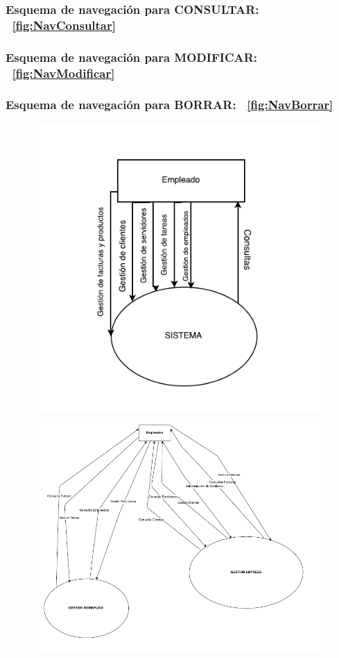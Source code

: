 \documentclass[paper=a4, fontsize=11pt, spanish]{scrartcl}
\begin{document}
\subsubsection* {Esquema de navegación para CONSULTAR: ~\ref{fig:NavConsultar}}
\subsubsection* {Esquema de navegación para MODIFICAR: ~\ref{fig:NavModificar}}
\subsubsection* {Esquema de navegación para BORRAR: ~\ref{fig:NavBorrar}}


\begin{figure}
	\includegraphics{ERP_EMEGEX.png}
	\caption{}
	\label{fig:cajanegra}
\end{figure}

\begin{figure}
	\includegraphics[width=1.25\textwidth]{ArmazonF.png}
	\caption{}
	\label{fig:armazonF}
\end{figure}
\end{document}
